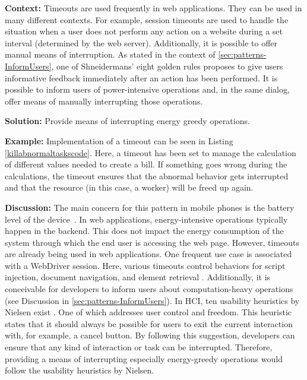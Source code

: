 \textbf{Context:} Timeouts are used frequently in web applications. They can be used in many different contexts. For example, session timeouts are used to handle the situation when a user does not perform any action on a website during a set interval (determined by the web server). Additionally, it is possible to offer manual means of interruption. As stated in the context of \ref{sec:patterns-InformUsers}, one of Shneidermans' eight golden rules proposes to give users informative feedback immediately after an action has been performed. It is possible to inform users of power-intensive operations and, in the same dialog, offer means of manually interrupting those operations.

\textbf{Solution:} Provide means of interrupting energy greedy operations.

\textbf{Example:} Implementation of a timeout can be seen in Listing \ref{killabnormaltaskscode}. Here, a timeout has been set to manage the calculation of different values needed to create a bill. If something goes wrong during the calculations, the timeout ensures that the abnormal behavior gets interrupted and that the resource (in this case, a worker) will be freed up again.




\textbf{Discussion:} The main concern for this pattern in mobile phones is the battery level of the device~\cite{cruz2019catalog}. In web applications, energy-intensive operations typically happen in the backend. This does not impact the energy consumption of the system through which the end user is accessing the web page. 
However, timeouts are already being used in web applications. One frequent use case is associated with a WebDriver session. Here, various timeouts control behaviors for script injection, document navigation, and element retrieval \cite{dev-mozilla-timeouts}.  Additionally, it is conceivable for developers to inform users about computation-heavy operations (see Discussion in \ref{sec:patterns-InformUsers}). In HCI, ten usability heuristics by Nielsen exist \cite{nielsen-ten-usability-heuristics}. One of which addresses user control and freedom. This heuristic states that it should always be possible for users to exit the current interaction with, for example, a cancel button. By following this suggestion, developers can ensure that any kind of interaction or task can be interrupted. Therefore, providing a means of interrupting especially energy-greedy operations would follow the usability heuristics by Nielsen.



